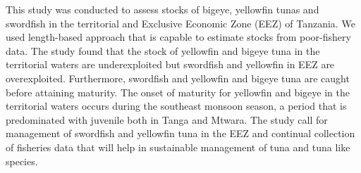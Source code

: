 This study was conducted to assess stocks of bigeye, yellowfin tunas and swordfish in the territorial and Exclusive Economic Zone (EEZ) of Tanzania. We used length-based approach that is capable to estimate stocks from poor-fishery data. The study found that the stock of yellowfin and bigeye tuna in the territorial waters are underexploited but swordfish and yellowfin in EEZ are overexploited. Furthermore, swordfish and yellowfin and bigeye tuna are caught before attaining maturity. The onset of maturity for yellowfin and bigeye in the territorial waters occurs during the southeast monsoon season, a period that is predominated with juvenile both in Tanga and Mtwara. The study call for management of swordfish and yellowfin tuna in the EEZ and continual collection of fisheries data that will  help in sustainable management of tuna and tuna like species. 
